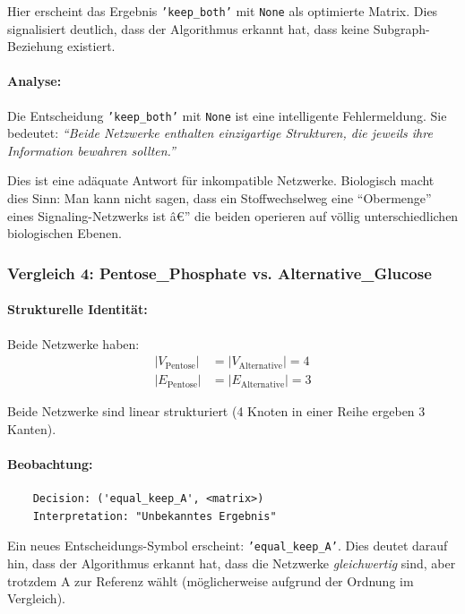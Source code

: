 ﻿\documentclass[a4paper,12pt]{article}
\theoremstyle{definition}
\begin{document}
Hier erscheint das Ergebnis \texttt{'keep\_both'} mit \texttt{None} als optimierte Matrix. Dies signalisiert deutlich, dass der Algorithmus erkannt hat, dass keine Subgraph-Beziehung existiert.

\paragraph{Analyse:}
Die Entscheidung \texttt{'keep\_both'} mit \texttt{None} ist eine intelligente Fehlermeldung. Sie bedeutet: \textit{``Beide Netzwerke enthalten einzigartige Strukturen, die jeweils ihre Information bewahren sollten.''}

Dies ist eine adäquate Antwort für inkompatible Netzwerke. Biologisch macht dies Sinn: Man kann nicht sagen, dass ein Stoffwechselweg eine ``Obermenge'' eines Signaling-Netzwerks ist â€” die beiden operieren auf völlig unterschiedlichen biologischen Ebenen.

\subsubsection{Vergleich 4: Pentose\_Phosphate vs. Alternative\_Glucose}

\paragraph{Strukturelle Identität:}
Beide Netzwerke haben:
\begin{align*}
	|V_{\text{Pentose}}| &= |V_{\text{Alternative}}| = 4 \\
	|E_{\text{Pentose}}| &= |E_{\text{Alternative}}| = 3
\end{align*}

Beide Netzwerke sind linear strukturiert (4 Knoten in einer Reihe ergeben 3 Kanten).

\paragraph{Beobachtung:}
\begin{verbatim}
	Decision: ('equal_keep_A', <matrix>)
	Interpretation: "Unbekanntes Ergebnis"
\end{verbatim}

Ein neues Entscheidungs-Symbol erscheint: \texttt{'equal\_keep\_A'}. Dies deutet darauf hin, dass der Algorithmus erkannt hat, dass die Netzwerke \textit{gleichwertig} sind, aber trotzdem A zur Referenz wählt (möglicherweise aufgrund der Ordnung im Vergleich).
\end{document}
